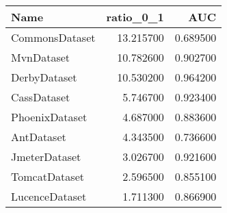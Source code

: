\begin{tabular}{lrr}
\toprule
Name & ratio_0_1 & AUC \\
\midrule
CommonsDataset & 13.215700 & 0.689500 \\
MvnDataset & 10.782600 & 0.902700 \\
DerbyDataset & 10.530200 & 0.964200 \\
CassDataset & 5.746700 & 0.923400 \\
PhoenixDataset & 4.687000 & 0.883600 \\
AntDataset & 4.343500 & 0.736600 \\
JmeterDataset & 3.026700 & 0.921600 \\
TomcatDataset & 2.596500 & 0.855100 \\
LucenceDataset & 1.711300 & 0.866900 \\
\bottomrule
\end{tabular}
